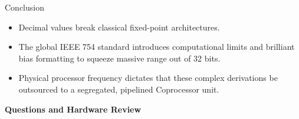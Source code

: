 \documentclass[aspectratio=169]{beamer}
\begin{document}
\begin{frame}{Conclusion}
\begin{itemize}
    \item Decimal values break classical fixed-point architectures.
    \item The global IEEE 754 standard introduces computational limits and brilliant bias formatting to squeeze massive range out of 32 bits.
    \item Physical processor frequency dictates that these complex derivations be outsourced to a segregated, pipelined Coprocessor unit.
\end{itemize}
\vspace{1cm}
\begin{center}
    \textbf{Questions and Hardware Review}
\end{center}
\end{frame}
\end{document}
